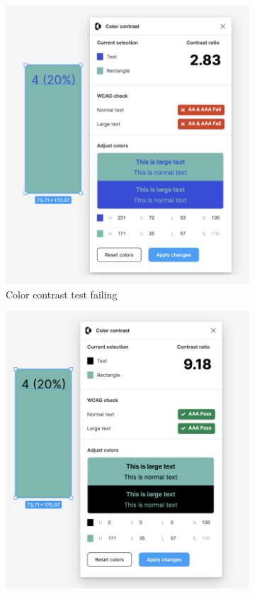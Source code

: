 \documentclass{master_thesis}
\begin{document}
\begin{figure}[h]
	\centering
	\begin{subfigure}{0.4\textwidth}
		\includegraphics[width=\textwidth]{img/figma plugin-color-contrast-fail.png}
		\caption{Color contrast test failing}
	\end{subfigure}
	\begin{subfigure}{0.4\textwidth}
		\includegraphics[width=\textwidth]{img/figma plugin-color-contrast-pass.png}

\end{subfigure}
\end{figure}
\end{document}
